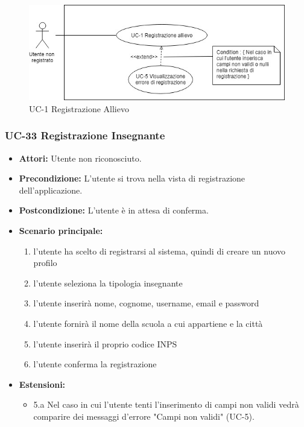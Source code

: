 \begin{figure}[h]
	\centering
	\includegraphics[scale=0.7]{images/UC-1_a.png}
	\caption{UC-1 Registrazione Allievo}
\end{figure}

\subsubsection{UC-33 Registrazione Insegnante}
\begin{itemize}
	\item \textbf{Attori: }Utente non riconosciuto.
	\item \textbf{Precondizione: }L'utente si trova nella vista di registrazione dell'applicazione.
	\item \textbf{Postcondizione: }L'utente è in attesa di conferma.
	\item \textbf{Scenario principale: }
	\begin{enumerate}
		\item l'utente ha scelto di registrarsi al sistema, quindi di creare un nuovo profilo
		\item l'utente seleziona la tipologia insegnante
		\item l'utente inserirà nome, cognome, username, email e password
		\item l'utente fornirà il nome della scuola a cui appartiene e la città
		\item l'utente inserirà il proprio codice INPS
		\item l'utente conferma la registrazione
	\end{enumerate}
	\item \textbf{Estensioni: }
	\begin{itemize}
		\item 5.a Nel caso in cui l'utente tenti l'inserimento di campi non validi vedrà comparire dei messaggi d'errore "Campi non validi" (UC-5).
	\end{itemize}
\end{itemize}

